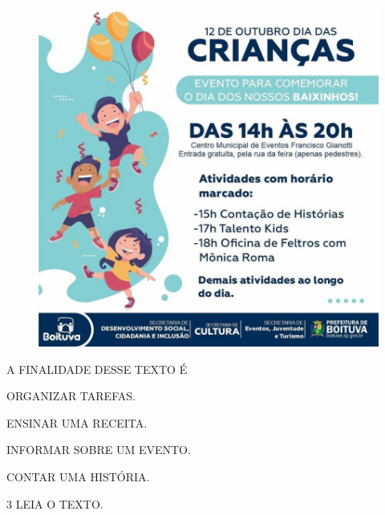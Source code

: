 \begin{figure}[H]
\centering
\includegraphics[width=\textwidth]{media/image158.jpg}
\end{figure}

A FINALIDADE DESSE TEXTO É

\begin{escolha}
\item ORGANIZAR TAREFAS.

\item ENSINAR UMA RECEITA.

\item INFORMAR SOBRE UM EVENTO.

\item CONTAR UMA HISTÓRIA.
\end{escolha}

\pagebreak
\num{3} LEIA O TEXTO.

